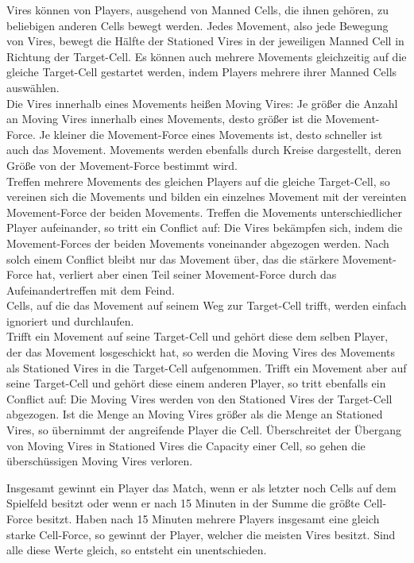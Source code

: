 Vires können von Players, ausgehend von Manned Cells, die ihnen gehören, zu beliebigen anderen Cells bewegt werden. 
Jedes Movement, also jede Bewegung von Vires, bewegt die Hälfte der Stationed Vires in der jeweiligen Manned Cell in Richtung der Target-Cell.
Es können auch mehrere Movements gleichzeitig auf die gleiche Target-Cell gestartet werden, indem Players mehrere ihrer Manned Cells auswählen. \\
Die Vires innerhalb eines Movements heißen Moving Vires: Je größer die Anzahl an Moving Vires innerhalb eines Movements, desto größer ist die Movement-Force.
Je kleiner die Movement-Force eines Movements ist, desto schneller ist auch das Movement.
Movements werden ebenfalls durch Kreise dargestellt, deren Größe von der Movement-Force bestimmt wird. \\
Treffen mehrere Movements des gleichen Players auf die gleiche Target-Cell, so vereinen sich die Movements und bilden ein einzelnes Movement mit der vereinten Movement-Force der beiden Movements.
Treffen die Movements unterschiedlicher Player aufeinander, so tritt ein Conflict auf: Die Vires bekämpfen sich, indem die Movement-Forces der beiden Movements voneinander abgezogen werden. Nach solch einem Conflict bleibt nur das Movement über, das die stärkere Movement-Force hat, verliert aber einen Teil seiner Movement-Force durch das Aufeinandertreffen mit dem Feind. \\
Cells, auf die das Movement auf seinem Weg zur Target-Cell trifft, werden einfach ignoriert und durchlaufen. \\
Trifft ein Movement auf seine Target-Cell und gehört diese dem selben Player, der das Movement losgeschickt hat, so werden die Moving Vires des Movements als Stationed Vires in die Target-Cell aufgenommen.
Trifft ein Movement aber auf seine Target-Cell und gehört diese einem anderen Player, so tritt ebenfalls ein Conflict auf: Die Moving Vires werden von den Stationed Vires der Target-Cell abgezogen. Ist die Menge an Moving Vires größer als die Menge an Stationed Vires, so übernimmt der angreifende Player die Cell.
Überschreitet der Übergang von Moving Vires in Stationed Vires die Capacity einer Cell, so gehen die überschüssigen Moving Vires verloren.

Insgesamt gewinnt ein Player das Match, wenn er als letzter noch Cells auf dem Spielfeld besitzt oder wenn er nach 15 Minuten in der Summe die größte Cell-Force besitzt. Haben nach 15 Minuten mehrere Players insgesamt eine gleich starke Cell-Force, so gewinnt der Player, welcher die meisten Vires besitzt. Sind alle diese Werte gleich, so entsteht ein unentschieden.

